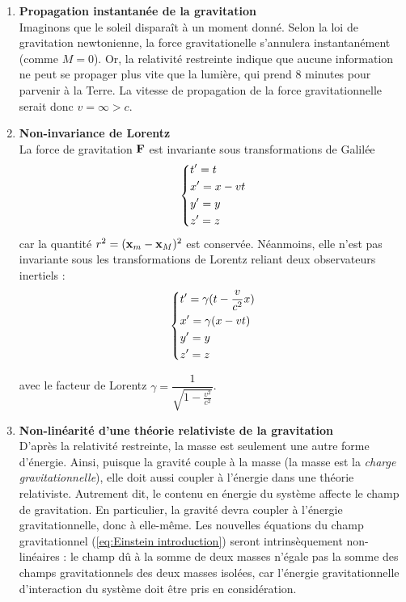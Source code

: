 \begin{enumerate}
    \item \textbf{Propagation instantanée de la gravitation} \\
    Imaginons que le soleil disparaît à un moment donné. Selon la loi de gravitation newtonienne, la force gravitationelle s'annulera instantanément (comme $M=0$). Or, la relativité restreinte indique que aucune information ne peut se propager plus vite que la lumière, qui prend 8 minutes pour parvenir à la Terre. La vitesse de propagation de la force gravitationnelle serait donc $v = \infty > c$.\\
    
    \item \textbf{Non-invariance de Lorentz}\\
    La force de gravitation $\bm{\mathrm{F}}$ est invariante sous transformations de Galilée 
    \begin{align}
        \begin{dcases}
            t' = t \\
            x' = x - vt\\
            y' = y\\
            z'=z
        \end{dcases}
    \end{align}
    car la quantité $r^2 = (\bm{\mathrm{x}}_m - \bm{\mathrm{x}}_M )^2 $ est conservée. Néanmoins, elle n'est pas invariante sous les transformations de Lorentz reliant deux observateurs inertiels :
    \begin{align}
        \begin{dcases}
            t' = \gamma(t - \frac{v}{c^2}x) \\
            x' = \gamma(x - vt)\\
            y' = y\\
            z'=z
        \end{dcases}
    \end{align}

    avec le facteur de Lorentz $\gamma = \dfrac{1}{\sqrt{1 - \frac{v^2}{c^2}}}$. \\
    
    \item \textbf{Non-linéarité d'une théorie relativiste de la gravitation}\\
    D'après la relativité restreinte, la masse est seulement une autre forme d'énergie. Ainsi, puisque la gravité couple à la masse (la masse est la \emph{charge gravitationnelle}), elle doit aussi coupler à l'énergie dans une théorie relativiste. Autrement dit, le contenu en énergie du système affecte le champ de gravitation. En particulier, la gravité devra coupler à l'énergie gravitationnelle, donc à elle-même. Les nouvelles équations du champ gravitationnel (\ref{eq:Einstein introduction}) seront intrinsèquement non-linéaires : le champ dû à la somme de deux masses n'égale pas la somme des champs gravitationnels des deux masses isolées, car l'énergie gravitationnelle d'interaction du système doit être pris en considération.\\
    

\end{enumerate}
